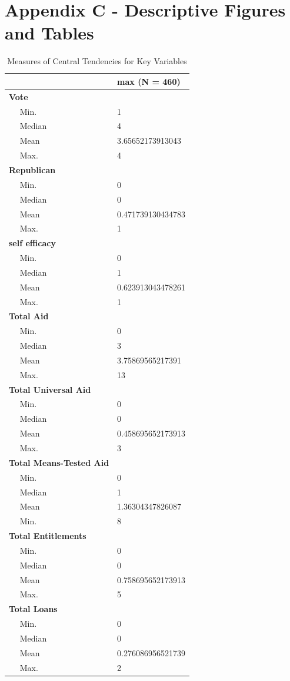 \documentclass[12pt]{paper}
\begin{document}
\section*{Appendix C - Descriptive Figures and Tables}
\begin{table}
\begin{tabular}{l|l}
	\hline
	& max (N = 460)\\
	\hline
	\bf{Vote} & ~\\
	\hline
	~~ Min. & 1\\
	\hline
	~~ Median & 4\\
	\hline
	~~ Mean & 3.65652173913043\\
	\hline
	~~ Max. & 4\\
	\hline
	\bf{Republican} & ~\\
	\hline
	~~ Min. & 0\\
	\hline
	~~ Median & 0\\
	\hline
	~~ Mean & 0.471739130434783\\
	\hline
	~~ Max. & 1\\
	\hline
	\bf{self efficacy} & ~\\
	\hline
	~~ Min. & 0\\
	\hline
	~~ Median & 1\\
	\hline
	~~ Mean & 0.623913043478261\\
	\hline
	~~ Max. & 1\\
	\hline
	\bf{Total Aid} & ~\\
	\hline
	~~ Min. & 0\\
	\hline
	~~ Median & 3\\
	\hline
	~~ Mean & 3.75869565217391\\
	\hline
	~~ Max. & 13\\
	\hline
	\bf{Total Universal Aid} & ~\\
	\hline
	~~ Min. & 0\\
	\hline
	~~ Median & 0\\
	\hline
	~~ Mean & 0.458695652173913\\
	\hline
	~~ Max. & 3\\
	\hline
	\bf{Total Means-Tested Aid} & ~\\
	\hline
	~~ Min. & 0\\
	\hline
	~~ Median & 1\\
	\hline
	~~ Mean & 1.36304347826087\\
	\hline
	~~ Min. & 8\\
	\hline
	\bf{Total Entitlements} & ~\\
	\hline
	~~ Min. & 0\\
	\hline
	~~ Median & 0\\
	\hline
	~~ Mean & 0.758695652173913\\
	\hline
	~~ Max. & 5\\
	\hline
	\bf{Total Loans} & ~\\
	\hline
	~~ Min. & 0\\
	\hline
	~~ Median & 0\\
	\hline
	~~ Mean & 0.276086956521739\\
	\hline
	~~ Max. & 2\\
	\hline
\end{tabular}
\caption{Measures of Central Tendencies for Key Variables}
\label{Appendix C.1}
\end{table}
\end{document}
